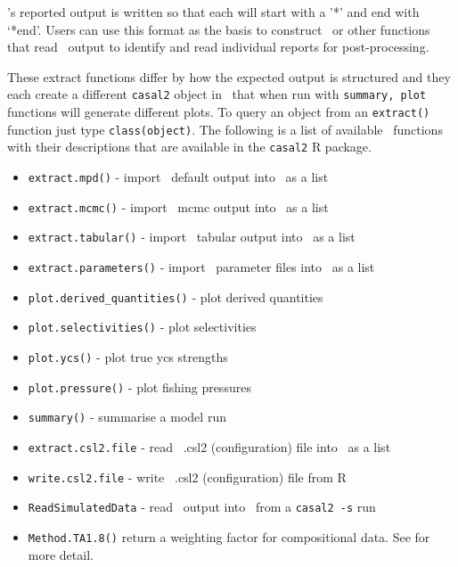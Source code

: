 \CNAME's reported output is written so that each  will start with a '*' and end with `*end'. Users can use this format as the basis to construct \R\ or other functions that read \CNAME\ output to identify and read individual reports for post-processing.


These extract functions differ by how the expected output is structured and they each create a different \texttt{casal2} object in \R\ that when run with \texttt{summary, plot} functions will generate different plots. To query an object from an \texttt{extract()} function just type \texttt{class(object)}. The following is a list of available \R\ functions with their descriptions that are available in the \texttt{casal2} R package.

\begin{itemize}
	\item \texttt{extract.mpd()} - import \CNAME\ default output into \R\ as a list
	\item \texttt{extract.mcmc()} - import \CNAME\ mcmc output into \R\ as a list
	\item \texttt{extract.tabular()} - import \CNAME\ tabular output into \R\ as a list
	\item \texttt{extract.parameters()} - import \CNAME\ parameter files into \R\ as a list
	\item \texttt{plot.derived\_quantities()} - plot derived quantities
	\item \texttt{plot.selectivities()} - plot selectivities
	\item \texttt{plot.ycs()} - plot true ycs strengths
	\item \texttt{plot.pressure()} - plot fishing pressures		
	\item \texttt{summary()} - summarise a model run	
	\item \texttt{extract.csl2.file} - read \CNAME\ .csl2 (configuration) file into \R\ as a list
	\item \texttt{write.csl2.file} - write \CNAME\ .csl2 (configuration) file from R
	\item \texttt{ReadSimulatedData} - read \CNAME\ output into \R\ from a \texttt{casal2 -s} run		
	\item \texttt{Method.TA1.8()} return a weighting factor for compositional data. See \cite{francis2011data} for more detail.
	
\end{itemize}

